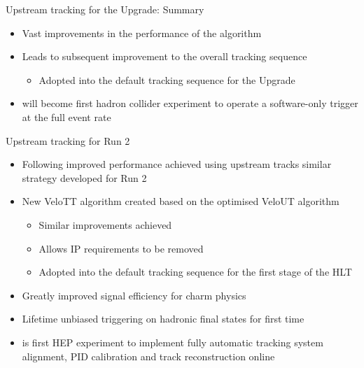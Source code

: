 \documentclass[aspectratio=1610]{beamer}
\begin{document}
\begin{frame}{Upstream tracking for the Upgrade: Summary}

\begin{itemize}
  \item Vast improvements in the performance of the \velout algorithm
  \item Leads to subsequent improvement to the overall tracking sequence
  \begin{itemize}
    \item[\ding{80}] Adopted into the default tracking sequence for the \lhcb Upgrade
  \end{itemize}
\end{itemize}

\begin{itemize}
  \item[\ding{80}] \lhcb will become first hadron collider experiment to operate a software-only trigger at the full event rate
\end{itemize}

\end{frame}

\begin{frame}{Upstream tracking for Run 2}

\begin{itemize}
  \item Following improved performance achieved using upstream tracks similar strategy developed for Run 2
  \item New VeloTT algorithm created based on the optimised VeloUT algorithm
  \begin{itemize}
    \item[\ding{80}] Similar improvements achieved
    \item[\ding{80}] Allows IP requirements to be removed
    \item[\ding{80}] Adopted into the default tracking sequence for the first stage of the HLT
  \end{itemize}
\end{itemize}

\begin{itemize}
  \item[\ding{80}] Greatly improved signal efficiency for charm physics
  \item[\ding{80}] Lifetime unbiased triggering on hadronic final states for first time
  \item[\ding{80}] \lhcb is first HEP experiment to implement fully automatic tracking system alignment, PID calibration and track reconstruction online
\end{itemize}

\end{frame}
\end{document}
